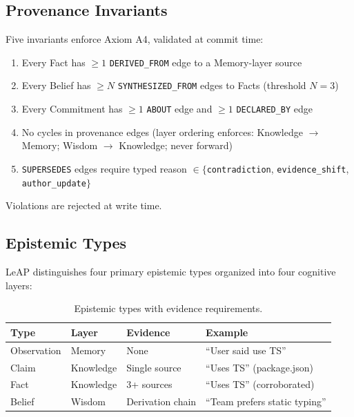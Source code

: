 \documentclass[11pt,letterpaper]{article}
\begin{document}
\subsection{Provenance Invariants}

Five invariants enforce Axiom A4, validated at commit time:

\begin{enumerate}[noitemsep]
    \item[\textbf{I1}] Every Fact has $\geq 1$ \texttt{DERIVED\_FROM} edge to a Memory-layer source
    \item[\textbf{I2}] Every Belief has $\geq N$ \texttt{SYNTHESIZED\_FROM} edges to Facts (threshold $N = 3$)
    \item[\textbf{I3}] Every Commitment has $\geq 1$ \texttt{ABOUT} edge and $\geq 1$ \texttt{DECLARED\_BY} edge
    \item[\textbf{I4}] No cycles in provenance edges (layer ordering enforces: Knowledge $\to$ Memory; Wisdom $\to$ Knowledge; never forward)
    \item[\textbf{I5}] \texttt{SUPERSEDES} edges require typed reason $\in \{$\texttt{contradiction}, \texttt{evidence\_shift}, \texttt{author\_update}$\}$
\end{enumerate}

Violations are rejected at write time.

\subsection{Epistemic Types}

LeAP distinguishes four primary epistemic types organized into four cognitive layers:

\begin{table}[H]
\centering
\caption{Epistemic types with evidence requirements.}
\label{tab:types}
\begin{tabular}{@{}llll@{}}
\toprule
\textbf{Type} & \textbf{Layer} & \textbf{Evidence} & \textbf{Example} \\
\midrule
Observation & Memory & None & ``User said use TS'' \\
Claim & Knowledge & Single source & ``Uses TS'' (package.json) \\
Fact & Knowledge & 3+ sources & ``Uses TS'' (corroborated) \\
Belief & Wisdom & Derivation chain & ``Team prefers static typing'' \\
\bottomrule
\end{tabular}
\end{table}
\end{document}
